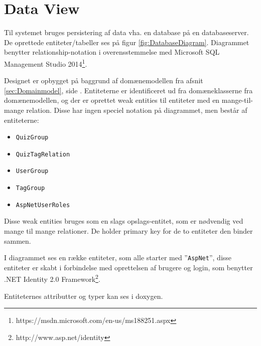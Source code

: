 \section{Data View}

Til systemet bruges persistering af data vha. en database på en databaseserver. De oprettede entiteter/tabeller ses på figur \ref{fig:DatabaseDiagram}. Diagrammet benytter relationship-notation i overensstemmelse med Microsoft SQL Management Studio 2014\footnote{https://msdn.microsoft.com/en-us/ms188251.aspx}.

Designet er opbygget på baggrund af domænemodellen fra afsnit \ref{sec:Domainmodel}, side \pageref{sec:Domainmodel}. Entiteterne er identificeret ud fra domæneklasserne fra domænemodellen, og der er oprettet weak entities til entiteter med en mange-til-mange relation. Disse har ingen speciel notation på diagrammet, men består af entiteterne:

\begin{itemize}
	\item\verb+QuizGroup+
	\item\verb+QuizTagRelation+
	\item\verb+UserGroup+
	\item\verb+TagGroup+
	\item\verb+AspNetUserRoles+
\end{itemize}

Disse weak entities bruges som en slags opslags-entitet, som er nødvendig ved mange til mange relationer. De holder primary key for de to entiteter den binder sammen.

I diagrammet ses en række entiteter, som alle starter med ''\verb+AspNet+'', disse entiteter er skabt i forbindelse med oprettelsen af brugere og login, som benytter .NET Identity 2.0 Framework\footnote{http://www.asp.net/identity}.


Entiteternes attributter og typer kan ses i doxygen.
